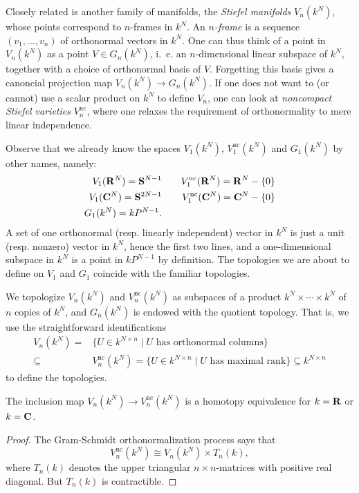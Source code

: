 \documentclass[a4paper,openany]{scrbook}
\begin{document}
Closely related is another family of manifolds, the \emph{Stiefel manifolds} $V_n(k^N)$, whose points correspond to $n$-frames in $k^N$. An \emph{$n$-frame} is a sequence $(v_1,\dots,v_n)$ of orthonormal vectors in $k^N$. One can thus think of a point in $V_n(k^N)$ as a point $V \in G_n(k^N)$, i.~e. an $n$-dimensional linear subspace of $k^N$, together with a choice of orthonormal basis of $V$. Forgetting this basis gives a canoncial projection map $V_n(k^N) \to G_n(k^N)$. If one does not want to (or cannot) use a scalar product on $k^N$ to define $V_n$, one can look at \emph{noncompact Stiefel varieties} $V_n^{\operatorname{nc}}$, where one relaxes the requirement of orthonormality to mere linear independence.

Observe that we already know the spaces $V_1(k^N)$, $V_1^{\operatorname{nc}}(k^N)$ and $G_1(k^N)$ by other names, namely:
\begin{eqnarray*}
V_1(\mathbf R^{N}) = \mathbf S^{N-1} & \quad & V_1^{\operatorname{nc}}(\mathbf R^N) = \mathbf R^N-\{0\}\\
V_1(\mathbf C^N) = \mathbf S^{2N-1} & \quad & V_1^{\operatorname{nc}}(\mathbf C^N) = \mathbf C^N-\{0\}\\
G_1(k^N) = k P^{N-1}.
\end{eqnarray*}
A set of one orthonormal (resp. linearly independent) vector in $k^N$ is just a unit (resp. nonzero) vector in $k^N$, hence the first two lines, and a one-dimensional subspace in $k^N$ is a point in $k P^{N-1}$ by definition. The topologies we are about to define on $V_1$ and $G_1$ coincide with the familiar topologies.

We topologize $V_n(k^N)$ and $V_n^{\operatorname{nc}}(k^N)$ as subspaces of a product $k^N \times \cdots \times k^N$ of $n$ copies of $k^N$, and $G_n(k^N)$ is endowed with the quotient topology. That is, we use the straightforward identifications
\begin{align*}
V_n(k^N) = & \{ U \in k^{N \times n} \mid U \text{ has orthonormal columns}\} \\
\subseteq & V_n^{\operatorname{nc}}(k^N) = \{ U \in k^{N \times n} \mid U \text{ has maximal rank}\} \subseteq k^{N \times n}
\end{align*}
to define the topologies.

\begin{lemma}
The inclusion map $V_n(k^N) \to V_n^{\operatorname{nc}}(k^N)$ is a homotopy equivalence for $k=\mathbf R$ or $k=\mathbf C$.
\end{lemma}
\begin{proof}
The Gram-Schmidt orthonormalization process says that
\[
V_n^{\operatorname{nc}}(k^N) \cong V_n(k^N) \times T_n(k),
\]
where $T_n(k)$ denotes the upper triangular $n\times n$-matrices with positive real diagonal. But $T_n(k)$ is contractible.
\end{proof}
\end{document}
